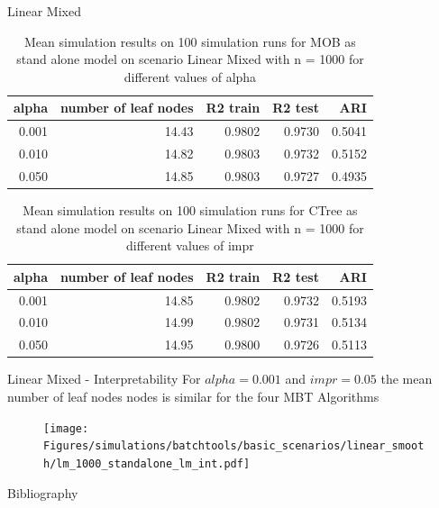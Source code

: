 \documentclass[9pt, xcolor=table]{beamer}
\begin{document}
\begin{frame}{Linear Mixed}
\begin{table}

\caption{Mean simulation results on 100 simulation runs for MOB as stand alone model on scenario Linear Mixed with n = 1000 for different values of alpha }
\centering
\begin{tabular}[t]{r|r|r|r|r}
\hline
alpha & number of leaf nodes & R2 train & R2 test & ARI\\
\hline
0.001 & 14.43 & 0.9802 & 0.9730 & 0.5041\\
\hline
0.010 & 14.82 & 0.9803 & 0.9732 & 0.5152\\
\hline
0.050 & 14.85 & 0.9803 & 0.9727 & 0.4935\\
\hline
\end{tabular}
\end{table}

\begin{table}

\caption{Mean simulation results on 100 simulation runs for CTree as stand alone model on scenario Linear Mixed with n = 1000 for different values of impr }
\centering
\begin{tabular}[t]{r|r|r|r|r}
\hline
alpha & number of leaf nodes & R2 train & R2 test & ARI\\
\hline
0.001 & 14.85 & 0.9802 & 0.9732 & 0.5193\\
\hline
0.010 & 14.99 & 0.9802 & 0.9731 & 0.5134\\
\hline
0.050 & 14.95 & 0.9800 & 0.9726 & 0.5113\\
\hline
\end{tabular}
\end{table}
    
\end{frame}

\begin{frame}{Linear Mixed - Interpretability}
For  $alpha= 0.001$ and $impr = 0.05$ the mean number of leaf nodes nodes is similar for the four MBT Algorithms
\begin{figure}
    \texttt{[image: Figures/simulations/batchtools/basic\_scenarios/linear\_smooth/lm\_1000\_standalone\_lm\_int.pdf]}
\end{figure}     
\end{frame}


\begin{frame}{Bibliography}
    
    

\end{frame}
\end{document}
